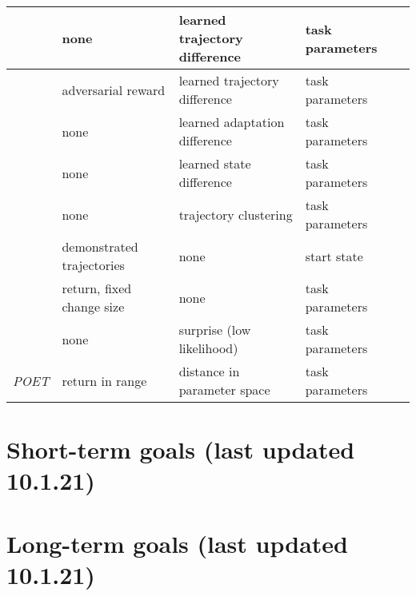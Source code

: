 \documentclass[letterpaper]{article}
\theoremstyle{definition}
\begin{document}
\begin{table*}
\begin{tabular}{|l | l | l | l  | l|}
	\cite{Mehta2019} & none & learned trajectory difference & task parameters \\ \hline
	\cite{Raparthy2020} & adversarial reward & learned trajectory difference & task parameters \\ \hline
	\cite{Mehta2020} & none & learned adaptation difference & task parameters \\ \hline
	\cite{Gupta2018} & none & learned state difference & task parameters \\ \hline
	\cite{Jabri2019} & none & trajectory clustering & task parameters \\ \hline
	\cite{Srinivasan2019} & demonstrated trajectories & none & start state \\ \hline
	\cite{Akkaya2019} & return, fixed change size & none & task parameters \\ \hline
	\cite{Kaddour2020} & none & surprise (low likelihood) & task parameters \\ \hline
	\textit{POET} \cite{Wang2019} & return in range & distance in parameter space & task parameters \\ \hline
\end{tabular}
\end{table*}

\section{Short-term goals (last updated 10.1.21)} \label{sec:short-term}

\section{Long-term goals (last updated 10.1.21)} \label{sec:long-term}

\clearpage


\end{document}
